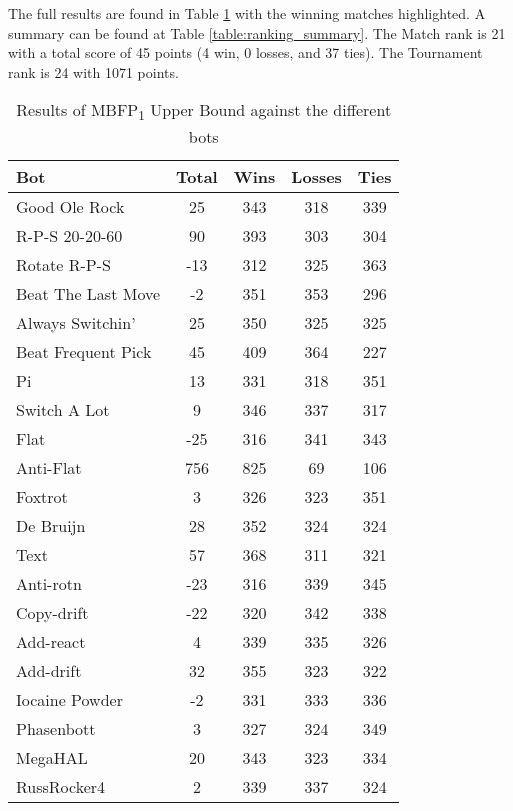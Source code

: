 The full results are found in Table \ref{table:JustMBFP_UpperBound_results} with the winning matches highlighted. A summary can be found at Table \ref{table:ranking_summary}. The Match rank is 21 with a total score of 45 points (4 win, 0 losses, and 37 ties). The Tournament rank is 24 with 1071 points.

\begin{table}
    \caption{Results of MBFP\textsubscript{1} Upper Bound against the different bots}
    \label{table:JustMBFP_UpperBound_results}
    \centering
    \begin{tabular}{|l|c|c|c|c|}
        \hline
        \textbf{Bot} & \textbf{Total} & \textbf{Wins} & \textbf{Losses} & \textbf{Ties} \\ \hline
Good Ole Rock & 25 & 343 & 318 & 339 \\ \hline 
\rowcolor{HighlightRowColor} R-P-S 20-20-60 & 90 & 393 & 303 & 304 \\ \hline 
Rotate R-P-S & -13 & 312 & 325 & 363 \\ \hline 
Beat The Last Move & -2 & 351 & 353 & 296 \\ \hline 
Always Switchin' & 25 & 350 & 325 & 325 \\ \hline 
Beat Frequent Pick & 45 & 409 & 364 & 227 \\ \hline 
Pi & 13 & 331 & 318 & 351 \\ \hline 
Switch A Lot & 9 & 346 & 337 & 317 \\ \hline 
Flat & -25 & 316 & 341 & 343 \\ \hline 
\rowcolor{HighlightRowColor} Anti-Flat & 756 & 825 & 69 & 106 \\ \hline 
Foxtrot & 3 & 326 & 323 & 351 \\ \hline 
De Bruijn & 28 & 352 & 324 & 324 \\ \hline 
\rowcolor{HighlightRowColor} Text & 57 & 368 & 311 & 321 \\ \hline 
Anti-rotn & -23 & 316 & 339 & 345 \\ \hline 
Copy-drift & -22 & 320 & 342 & 338 \\ \hline 
Add-react & 4 & 339 & 335 & 326 \\ \hline 
Add-drift & 32 & 355 & 323 & 322 \\ \hline 
Iocaine Powder & -2 & 331 & 333 & 336 \\ \hline 
Phasenbott & 3 & 327 & 324 & 349 \\ \hline 
MegaHAL & 20 & 343 & 323 & 334 \\ \hline 
RussRocker4 & 2 & 339 & 337 & 324 \\ \hline 

\end{tabular}
\end{table}
